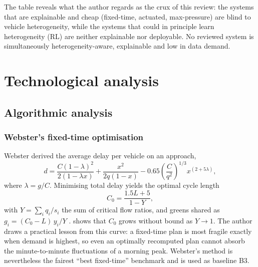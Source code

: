 The table reveals what the author regards as the crux of this review: the systems that are explainable and
cheap (fixed-time, actuated, max-pressure) are blind to vehicle heterogeneity, while the
systems that could in principle learn heterogeneity (RL) are neither explainable nor deployable. No reviewed
system is simultaneously heterogeneity-aware, explainable and low in data demand.

\section{Technological analysis}\label{sec:lit-tech}
\subsection{Algorithmic analysis}\label{sec:lit-algorithms}

\subsubsection{Webster's fixed-time optimisation}
Webster \cite{webster1958} derived the average delay per vehicle on an approach,
\begin{equation}
  d = \frac{C(1-\lambda)^2}{2(1-\lambda x)} + \frac{x^2}{2q(1-x)} - 0.65\left(\frac{C}{q^2}\right)^{1/3} x^{(2+5\lambda)},
  \label{eq:lit-webster-delay}
\end{equation}
where $\lambda=g/C$. Minimising total delay yields the optimal cycle length
\begin{equation}
  C_0 = \frac{1.5L + 5}{1 - Y},
  \label{eq:lit-webster-c0}
\end{equation}
with $Y=\sum_i q_i/s_i$ the sum of critical flow ratios, and greens shared as $g_i=(C_0-L)\,y_i/Y$
\cite{webster1958,koonce2008timing}.  shows that $C_0$ grows without bound as $Y\to 1$.
The author draws a practical lesson from this curve: a fixed-time plan is most fragile exactly when demand is
highest, so even an optimally recomputed plan cannot absorb the minute-to-minute fluctuations of a morning peak.
Webster's method is nevertheless the fairest ``best fixed-time'' benchmark and is used as baseline B3.

